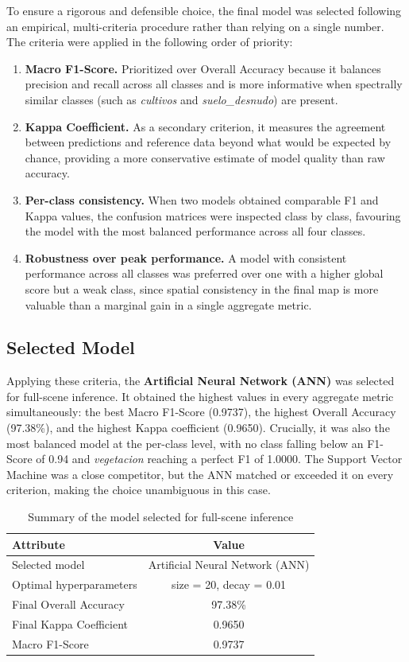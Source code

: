 \documentclass[12pt,a4paper]{article}
\begin{document}
To ensure a rigorous and defensible choice, the final model was selected following an empirical, multi-criteria procedure rather than relying on a single number. The criteria were applied in the following order of priority:
\begin{enumerate}
    \item \textbf{Macro F1-Score.} Prioritized over Overall Accuracy because it balances precision and recall across all classes and is more informative when spectrally similar classes (such as \textit{cultivos} and \textit{suelo\_desnudo}) are present.
    \item \textbf{Kappa Coefficient.} As a secondary criterion, it measures the agreement between predictions and reference data beyond what would be expected by chance, providing a more conservative estimate of model quality than raw accuracy.
    \item \textbf{Per-class consistency.} When two models obtained comparable F1 and Kappa values, the confusion matrices were inspected class by class, favouring the model with the most balanced performance across all four classes.
    \item \textbf{Robustness over peak performance.} A model with consistent performance across all classes was preferred over one with a higher global score but a weak class, since spatial consistency in the final map is more valuable than a marginal gain in a single aggregate metric.
\end{enumerate}

\subsection{Selected Model}

Applying these criteria, the \textbf{Artificial Neural Network (ANN)} was selected for full-scene inference. It obtained the highest values in every aggregate metric simultaneously: the best Macro F1-Score (0.9737), the highest Overall Accuracy (97.38\%), and the highest Kappa coefficient (0.9650). Crucially, it was also the most balanced model at the per-class level, with no class falling below an F1-Score of 0.94 and \textit{vegetacion} reaching a perfect F1 of 1.0000. The Support Vector Machine was a close competitor, but the ANN matched or exceeded it on every criterion, making the choice unambiguous in this case.

\begin{table}[H]
\centering
\begin{tabular}{|m{5cm}|c|}
\hline
\textbf{Attribute} & \textbf{Value} \\
\hline
Selected model & Artificial Neural Network (ANN) \\
\hline
Optimal hyperparameters & size = 20, decay = 0.01 \\
\hline
Final Overall Accuracy & 97.38\% \\
\hline
Final Kappa Coefficient & 0.9650 \\
\hline
Macro F1-Score & 0.9737 \\
\hline
\end{tabular}
\caption{Summary of the model selected for full-scene inference}
\end{table}
\end{document}
